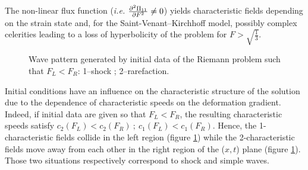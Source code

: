The non-linear flux function (\textit{i.e.} $\ddrond{\Pi_{11}}{F}{F}\neq 0$) yields characteristic fields depending on the strain state and, for the Saint-Venant--Kirchhoff model, possibly complex celerities leading to a loss of hyperbolicity of the problem for $F>\sqrt{\frac{1}{3}}$.
\begin{figure}[h]
  \centering
  \caption{Wave pattern generated by initial data of the Riemann problem such that $F_L<F_R$: 1--shock ; 2--rarefaction.}
  \label{fig:1S2R}
\end{figure}

Initial conditions have an influence on the characteristic structure of the solution due to the dependence of characteristic speeds on the deformation gradient. Indeed, if initial data are given so that $F_L < F_R$, the resulting characteristic speeds satisfy $c_2(F_L)<c_2(F_R) \: ; \: c_1(F_L)<c_1(F_R)$. Hence, the 1-characteristic fields collide in the left region (figure \ref{fig:1S2R}) while the 2-characteristic fields move away from each other in the right region of the ($x,t$) plane (figure \ref{fig:1S2R}). Those two situations respectively correspond to shock and simple waves.

